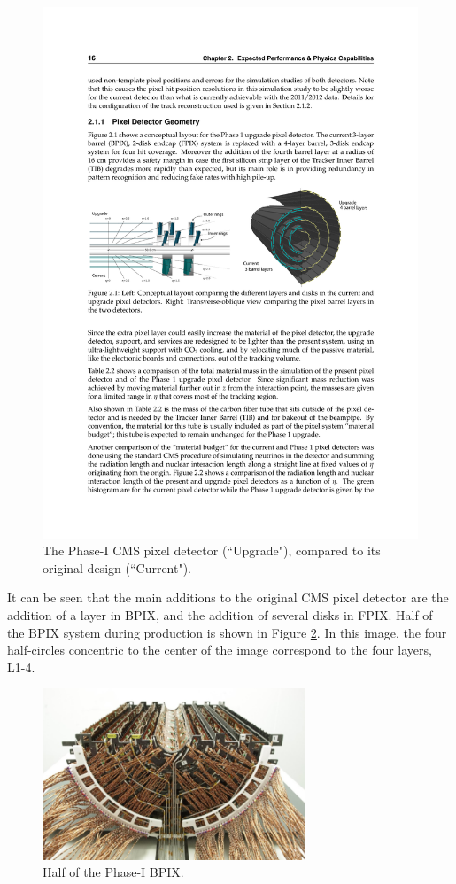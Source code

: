 \begin{figure}[H]
    \centering %
    \includegraphics[width=\textwidth]{Images/CMS/Tracker/Tracker_Phase_Compare.pdf}
    \caption{The Phase-I CMS pixel detector (``Upgrade"), compared to its original design (``Current").}
    \label{fig:Pixel_Tracker}
\end{figure}

It can be seen that the main additions to the original CMS pixel detector are the addition of a layer in BPIX, and the addition of several disks in FPIX. Half of the BPIX system during production is shown in Figure \ref{fig:BPIX_Half}. In this image, the four half-circles concentric to the center of the image correspond to the four layers, L1-4. 

\begin{figure}[H]
    \centering
    \includegraphics[width=0.7\textwidth]{Images/CMS/Tracker/BPIX.png}
    \caption{Half of the Phase-I BPIX.}
    \label{fig:BPIX_Half}
\end{figure}

